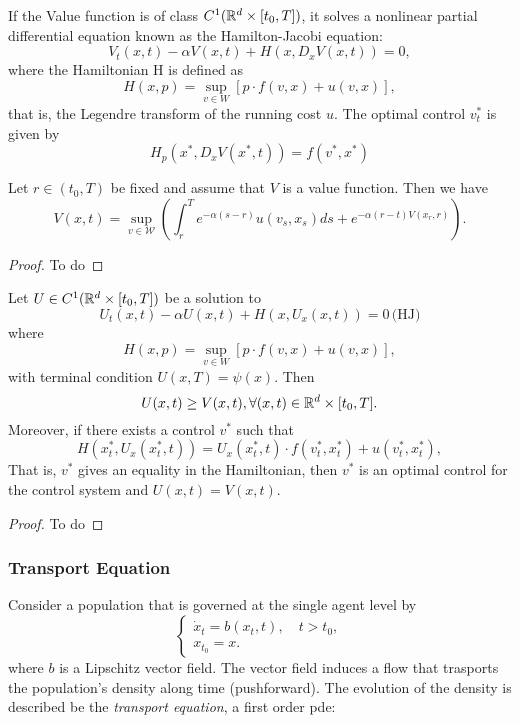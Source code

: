 \documentclass{article}
\begin{document}
If the Value function is of class $C^1(\mathbb{R}^d \times [t_0,T])$, it solves  a nonlinear partial differential equation known as the Hamilton-Jacobi equation:
$$V_t(x,t) - \alpha V(x,t) + H(x,D_x V(x,t)) = 0,$$
where the Hamiltonian H is defined as 
$$H(x,p) = \sup_{v\in W} [p \cdot f(v,x) + u(v,x)],$$
that is, the Legendre transform of the running cost $u$.
The optimal control $v_t^*$ is given by 
$$ H_p (x^*, D_x V(x^*,t)) = f(v^*, x^*)$$


\begin{proposition}
    Let $r \in (t_0, T)$ be fixed and assume that $V$ is a value function. Then we have
    $$
    V(x,t) = \sup_{v\in \mathcal{W}} \left( \int_r^T e^{-\alpha (s-r)} u(v_s,x_s) ds + e^{-\alpha (r - t) V(x_r,r)} \right).
    $$
\end{proposition}

\begin{proof}
    To do
\end{proof}

\begin{proposition}
    Let $U \in C^1(\mathbb{R}^d \times [t_0, T])$ be a solution to 
    $$
    U_t(x,t) - \alpha U(x,t) + H(x, U_x(x,t)) = 0\, \text{(HJ)}
    $$
    where 
    $$
    H(x,p) = \sup_{v \in W} [p \cdot f(v,x) + u(v,x)],
    $$
    with terminal condition $U(x,T) = \psi(x)$. Then
    $$U(x,t) \geq V(x,t), \forall (x,t) \in \mathbb{R}^d \times [t_0,T].$$
    Moreover, if there exists a control $v^*$ such that
    $$
    H(x^*_t, U_x (x^*_t, t)) = U_x(x^*_t, t)\cdot f(v^*_t, x^*_t) + u(v^*_t, x^*_t),
    $$
    That is, $v^*$ gives an equality in the Hamiltonian, then $v^*$ is an optimal control for the control system and $U(x,t) = V(x,t)$.
\end{proposition}

\begin{proof}
    To do
\end{proof}


\subsubsection{Transport Equation}\label{transport_eq}
Consider a population that is governed at the single agent level by
\begin{equation}\label{transport_eq:ode}
\begin{cases}
    \dot x_t = b(x_t,t), \quad t > t_0,\\
    x_{t_0} = x.
\end{cases}
\end{equation}
where $b$ is a Lipschitz vector field. The vector field induces a flow that trasports the population's density along time (pushforward). The evolution of the density is described be the \textit{transport equation}, a first order pde:  
\end{document}
